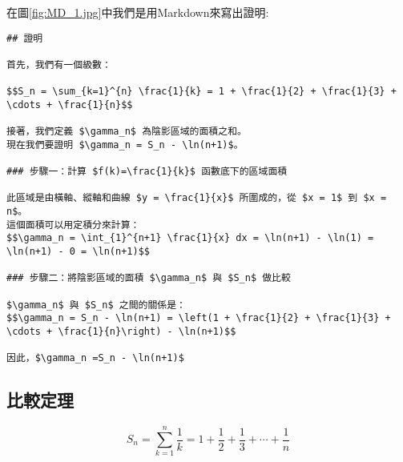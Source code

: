 \documentclass[12pt, a4paper]{article}
\begin{document}
在圖\;\ref{fig:MD_1.jpg}\;中我們是用Markdown來寫出證明\;:
\begin{lstlisting}
## 證明

首先，我們有一個級數：

$$S_n = \sum_{k=1}^{n} \frac{1}{k} = 1 + \frac{1}{2} + \frac{1}{3} + \cdots + \frac{1}{n}$$

接著，我們定義 $\gamma_n$ 為陰影區域的面積之和。
現在我們要證明 $\gamma_n = S_n - \ln(n+1)$。

### 步驟一：計算 $f(k)=\frac{1}{k}$ 函數底下的區域面積

此區域是由橫軸、縱軸和曲線 $y = \frac{1}{x}$ 所圍成的，從 $x = 1$ 到 $x = n$。
這個面積可以用定積分來計算：
$$\gamma_n = \int_{1}^{n+1} \frac{1}{x} dx = \ln(n+1) - \ln(1) = \ln(n+1) - 0 = \ln(n+1)$$

### 步驟二：將陰影區域的面積 $\gamma_n$ 與 $S_n$ 做比較

$\gamma_n$ 與 $S_n$ 之間的關係是：
$$\gamma_n = S_n - \ln(n+1) = \left(1 + \frac{1}{2} + \frac{1}{3} + \cdots + \frac{1}{n}\right) - \ln(n+1)$$

因此，$\gamma_n =S_n - \ln(n+1)$
\end{lstlisting}

\subsection{比較定理}

\begin{equation}
S_n=\sum_{k=1}^{n} \frac{1}{k}=1+\frac{1}{2}+\frac{1}{3}+\cdots+\frac{1}{n}
\end{equation}\label{eq:equation_12}
\end{document}
